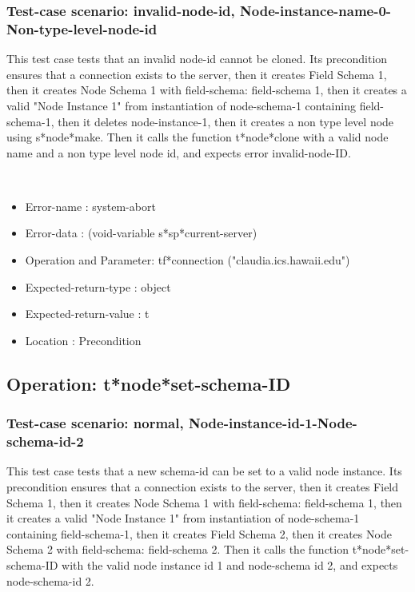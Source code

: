 \subsubsection {Test-case scenario: invalid-node-id, Node-instance-name-0-Non-type-level-node-id}


This test case tests that an invalid node-id cannot be cloned.
Its precondition ensures that a connection exists to the server, then it creates Field Schema 1, then it creates Node Schema 1 with field-schema: field-schema 1, then it creates a valid "Node Instance 1" from instantiation of node-schema-1 containing field-schema-1, then it deletes node-instance-1, then it creates a non type level node using s*node*make.
Then it calls the function t*node*clone  with a valid node name and a non type level node id, and expects error invalid-node-ID.



\
\begin {itemize}
\item 	Error-name             : system-abort
\item Error-data             : (void-variable s*sp*current-server)
\item Operation and Parameter: tf*connection ("claudia.ics.hawaii.edu")
\item Expected-return-type   : object
\item Expected-return-value  : t
\item Location               : Precondition



\end {itemize}
\subsection {Operation: t*node*set-schema-ID}
\subsubsection {Test-case scenario: normal, Node-instance-id-1-Node-schema-id-2}


This test case tests that a new  schema-id can be set to a valid node instance.
Its precondition ensures that a connection exists to the server, then it creates Field Schema 1, then it creates Node Schema 1 with field-schema: field-schema 1, then it creates a valid "Node Instance 1" from instantiation of node-schema-1 containing field-schema-1, then it creates Field Schema 2, then it creates Node Schema 2 with field-schema: field-schema 2.
Then it calls the function t*node*set-schema-ID  with the valid node instance id 1 and node-schema id 2, and expects node-schema-id 2.



